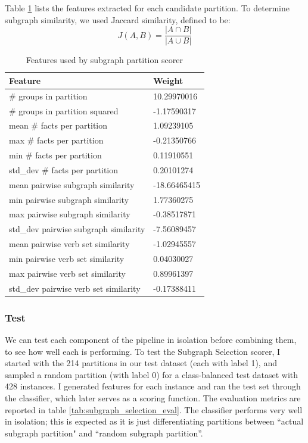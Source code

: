 \documentclass[12pt]{article}
\begin{document}
Table \ref{tab:subgraph_selection_features} lists the features extracted for each candidate partition. To determine subgraph similarity, we used
Jaccard similarity, defined to be:
$$J(A,B) = \frac{\lvert A \cap B \rvert}{\lvert A \cup B \rvert}$$

\begin{table}[H]
\centering
\caption{Features used by subgraph partition scorer}
\label{tab:subgraph_selection_features}
\begin{tabular}{@{}ll@{}}
\toprule
\textbf{Feature}                      & \textbf{Weight} \\ \midrule
\# groups in partition                & 10.29970016     \\
\# groups in partition squared        & -1.17590317     \\
mean \# facts per partition           & 1.09239105      \\
max \# facts per partition            & -0.21350766     \\
min \# facts per partition            & 0.11910551      \\
std\_dev \# facts per partition       & 0.20101274      \\
mean pairwise subgraph similarity     & -18.66465415    \\
min pairwise subgraph similarity      & 1.77360275      \\
max pairwise subgraph similarity      & -0.38517871     \\
std\_dev pairwise subgraph similarity & -7.56089457     \\
mean pairwise verb set similarity     & -1.02945557     \\
min pairwise verb set similarity      & 0.04030027      \\
max pairwise verb set similarity      & 0.89961397      \\
std\_dev pairwise verb set similarity & -0.17388411     \\ \bottomrule
\end{tabular}
\end{table}

\subsubsection{Test}

We can test each component of the pipeline in isolation before combining them, to see how well each is performing. To test the Subgraph Selection scorer, I started with the 214 partitions in our test dataset (each with label 1), and sampled a random partition (with label 0) for a class-balanced test dataset with 428 instances. I generated features for each instance and ran the test set through the classifier, which later serves as a scoring function. The evaluation metrics are reported in table \ref{tab:subgraph_selection_eval}. The classifier performs very well in isolation; this is expected as it is just differentiating partitions between ``actual subgraph partition" and ``random subgraph partition''.
\end{document}
